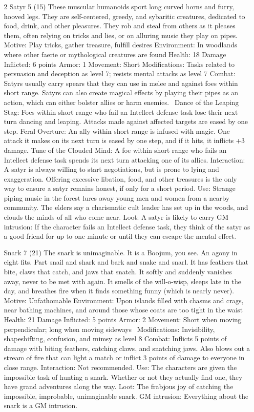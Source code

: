 \begin{multicols}{2}
Satyr 5 (15)
These muscular humanoids sport long curved horns and furry, hooved legs. They are self-centered, greedy, and sybaritic creatures, dedicated to food, drink, and other pleasures. They rob and steal from others as it pleases them, often relying on tricks and lies, or on alluring music they play on pipes.
Motive: Play tricks, gather treasure, fulfill desires
Environment: In woodlands where other faerie or mythological creatures are found
Health: 18
Damage Inflicted: 6 points
Armor: 1
Movement: Short
Modifications: Tasks related to persuasion and deception as level 7; resists mental attacks as level 7
Combat: Satyrs usually carry spears that they can use in melee and against foes within short range.
Satyrs can also create magical effects by playing their pipes as an action, which can either bolster allies or harm enemies. 
Dance of the Leaping Stag: Foes within short range who fail an Intellect defense task lose their next turn dancing and leaping. Attacks made against affected targets are eased by one step.
Feral Overture: An ally within short range is infused with magic. One attack it makes on its next turn is eased by one step, and if it hits, it inflicts +3 damage.
Tune of the Clouded Mind: A foe within short range who fails an Intellect defense task spends its next turn attacking one of its allies.
Interaction: A satyr is always willing to start negotiations, but is prone to lying and exaggeration. Offering excessive libation, food, and other treasures is the only way to ensure a satyr remains honest, if only for a short period.
Use: Strange piping music in the forest lures away young men and women from a nearby community. The elders say a charismatic cult leader has set up in the woods, and clouds the minds of all who come near.
Loot: A satyr is likely to carry
GM intrusion: If the character fails an Intellect defense task, they think of the satyr as a good friend for up to one minute or until they can escape the mental effect.

Snark 7 (21)
The snark is unimaginable. It is a Boojum, you see. An agony in eight fits. Part snail and shark and bark and snake and snarl. It has feathers that bite, claws that catch, and jaws that snatch. It softly and suddenly vanishes away, never to be met with again. It smells of the will-o-wisp, sleeps late in the day, and breathes fire when it finds something funny (which is nearly never).
Motive: Unfathomable
Environment: Upon islands filled with chasms and crags, near bathing machines, and around those whose coats are too tight in the waist Health: 21
Damage Inflicted: 5 points
Armor: 2
Movement: Short when moving perpendicular; long when moving sideways 
Modifications: Invisibility, shapeshifting, confusion, and mimsy as level 8
Combat: Inflicts 5 points of damage with biting feathers, catching claws, and snatching jaws. Also blows out a stream of fire that can light a match or inflict 3 points of damage to everyone in close range.
Interaction: Not recommended.
Use: The characters are given the impossible task of hunting a snark. Whether or not they actually find one, they have grand adventures along the way.
Loot: The frabjous joy of catching the impossible, improbable, unimaginable snark.
GM intrusion: Everything about the snark is a GM intrusion.


\end{multicols}
